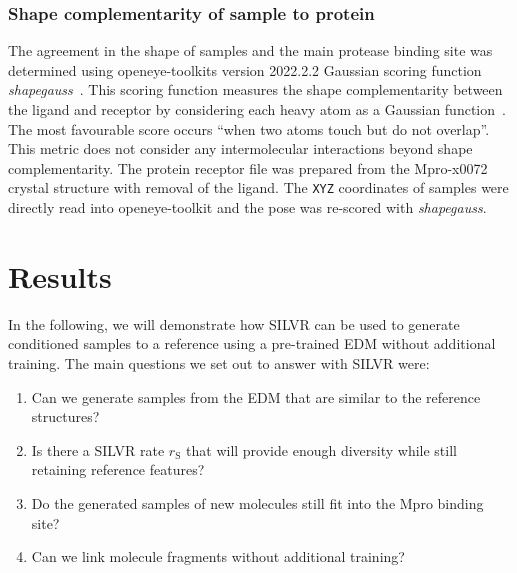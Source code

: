 \documentclass[journal=jacsat,manuscript=article]{achemso}
\begin{document}
\subsubsection{Shape complementarity of sample to protein}
The agreement in the shape of samples and the main protease binding site was determined using openeye-toolkits version 2022.2.2 Gaussian scoring function \textit{shapegauss}~\cite{openeyescientificsoftwareinc.oedocking,kelley2015posit}. This scoring function measures the shape complementarity between the ligand and receptor by considering each heavy atom as a Gaussian function~\cite{mcgann2003gaussian}. The most favourable score occurs “when two atoms touch but do not overlap”.  This metric does not consider any intermolecular interactions beyond shape complementarity. The protein receptor file was prepared from the Mpro-x0072 crystal structure with removal of the ligand. The \texttt{XYZ} coordinates of samples were directly read into openeye-toolkit and the pose was re-scored with \textit{shapegauss}. 


\section{Results}
In the following, we will demonstrate how SILVR can be used to generate conditioned samples to a reference using a pre-trained EDM without additional training. The main questions we set out to answer with SILVR were:
\begin{enumerate}
    \item Can we generate samples from the EDM that are similar to the reference structures?
    \item Is there a SILVR rate $r_{\mathrm{S}}$ that will provide enough diversity while still retaining reference features?
    \item Do the generated samples of new molecules still fit into the Mpro binding site?
    \item Can we link molecule fragments without additional training?
\end{enumerate}
\end{document}
